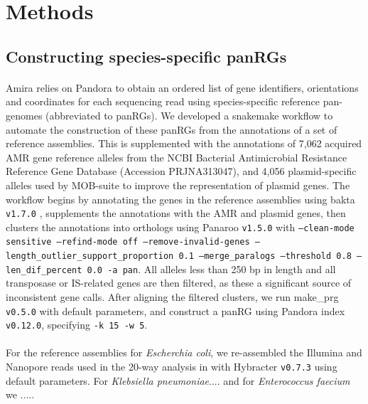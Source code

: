 \section*{Methods}

\subsection*{Constructing species-specific panRGs}
\paragraph{}
Amira relies on Pandora \cite{pandora} to obtain an ordered list of gene identifiers, orientations and coordinates for each sequencing read using species-specific reference pan-genomes (abbreviated to panRGs). We developed a snakemake \cite{10.1093/bioinformatics/bts480} workflow to automate the construction of these panRGs from the annotations of a set of reference assemblies. This is supplemented with the annotations of 7,062 acquired AMR gene reference alleles from the NCBI Bacterial Antimicrobial Resistance Reference Gene Database (Accession PRJNA313047), and 4,056 plasmid-specific alleles used by MOB-suite \cite{10.1099/mgen.0.000206} to improve the representation of plasmid genes. The workflow begins by annotating the genes in the reference assemblies using bakta \texttt{v1.7.0} \cite{Schwengers2021}, supplements the annotations with the AMR and plasmid genes, then clusters the annotations into orthologs using Panaroo \texttt{v1.5.0} \cite{panaroo} with \texttt{--clean-mode sensitive --refind-mode off --remove-invalid-genes --length\_outlier\_support\_proportion 0.1 --merge\_paralogs --threshold 0.8 --len\_dif\_percent 0.0 -a pan}. All alleles less than 250 bp in length and all transposase or IS-related genes are then filtered, as these a significant source of inconsistent gene calls. After aligning the filtered clusters, we run make\_prg \texttt{v0.5.0} with default parameters, and construct a panRG using Pandora \cite{pandora} index \texttt{v0.12.0}, specifying \texttt{-k 15 -w 5}. 
\paragraph{}
For the reference assemblies for \textit{Escherchia coli}, we re-assembled the Illumina and Nanopore reads used in the 20-way analysis in \cite{pandora} with Hybracter \texttt{v0.7.3} \cite{Bouras2024} using default parameters. For \textit{Klebsiella pneumoniae}.... and for \textit{Enterococcus faecium} we .....

